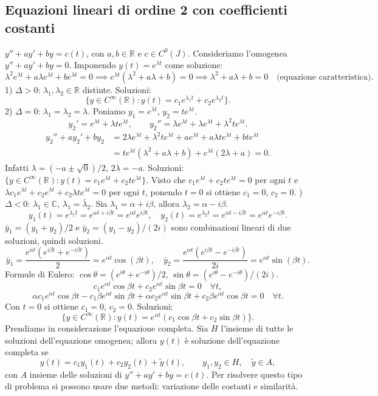 \documentclass[11pt,a4paper]{article}
\newcommand{\R}{\mathbb R}\newcommand{\N}{\mathbb N}\newcommand{\pagina}[1]{\clearpage}
\begin{document}
\subsection*{Equazioni lineari di ordine 2 con coefficienti costanti}
$y''+ay'+by=c(t)$, con $a,b\in\R$ e $c\in C^0(J)$. Consideriamo l'omogenea $y''+ay'+by=0$. Imponendo $y(t)=e^{\lambda t}$ come soluzione:
\[\lambda^2e^{\lambda t}+a\lambda e^{\lambda t}+be^{\lambda t}=0\implies e^{\lambda t}(\lambda^2+a\lambda+b)=0\implies\lambda^2+a\lambda+b=0\quad\text{(equazione caratteristica)}.\]
1) $\Delta>0$: $\lambda_1,\lambda_2\in\R$ distinte. Soluzioni:
\[\{y\in C^\infty(\R):y(t)=c_1e^{\lambda_1t}+c_2e^{\lambda_2t}\}.\]
2) $\Delta=0$: $\lambda_1=\lambda_2=\lambda$. Poniamo $y_1=e^{\lambda t}$, $y_2=te^{\lambda t}$.
\[y_2'=e^{\lambda t}+\lambda te^{\lambda t},\qquad y_2''=\lambda e^{\lambda t}+\lambda e^{\lambda t}+\lambda^2te^{\lambda t}.\]
\begin{align*}
 y_2''+ay_2'+by_2&=2\lambda e^{\lambda t}+\lambda^2te^{\lambda t}+ae^{\lambda t}+a\lambda te^{\lambda t}+bte^{\lambda t}\\
 &=te^{\lambda t}(\lambda^2+a\lambda+b)+e^{\lambda t}(2\lambda+a)=0.
\end{align*}
Infatti $\lambda=(-a\pm\sqrt0)/2$, $2\lambda=-a$.
Soluzioni: $\{y\in C^\infty(\R):y(t)=c_1e^{\lambda t}+c_2te^{\lambda t}\}$.
Visto che $c_1e^{\lambda t}+c_2te^{\lambda t}=0$ per ogni $t$ e $\lambda c_1e^{\lambda t}+c_2e^{\lambda t}+c_2\lambda te^{\lambda t}=0$ per ogni $t$, ponendo $t=0$ si ottiene $c_1=0$, $c_2=0$.
\pagina{52}
3) $\Delta<0$: $\lambda_1\in\mathbb C$, $\lambda_1=\bar\lambda_2$. Sia $\lambda_1=\alpha+i\beta$, allora $\lambda_2=\alpha-i\beta$.
\[y_1(t)=e^{\lambda_1t}=e^{\alpha t+i\beta t}=e^{\alpha t}e^{i\beta t},\quad y_2(t)=e^{\lambda_2t}=e^{\alpha t-i\beta t}=e^{\alpha t}e^{-i\beta t}.\]
$\bar y_1=(y_1+y_2)/2$ e $\bar y_2=(y_1-y_2)/(2i)$ sono combinazioni lineari di due soluzioni, quindi soluzioni.
\[\bar y_1=\frac{e^{\alpha t}(e^{i\beta t}+e^{-i\beta t})}2=e^{\alpha t}\cos(\beta t),\quad
\bar y_2=\frac{e^{\alpha t}(e^{i\beta t}-e^{-i\beta t})}{2i}=e^{\alpha t}\sin(\beta t).\]
Formule di Eulero: $\cos\theta=(e^{i\theta}+e^{-i\theta})/2$, $\sin\theta=(e^{i\theta}-e^{-i\theta})/(2i)$.
\[c_1e^{\alpha t}\cos\beta t+c_2e^{\alpha t}\sin\beta t=0\quad\forall t,\]
\[\alpha c_1e^{\alpha t}\cos\beta t-c_1\beta e^{\alpha t}\sin\beta t+\alpha c_2e^{\alpha t}\sin\beta t+c_2\beta e^{\alpha t}\cos\beta t=0\quad\forall t.\]
Con $t=0$ si ottiene $c_1=0$, $c_2=0$. Soluzioni:
\[\{y\in C^\infty(\R):y(t)=e^{\alpha t}(c_1\cos\beta t+c_2\sin\beta t)\}.\]
Prendiamo in considerazione l'equazione completa. Sia $H$ l'insieme di tutte le soluzioni dell'equazione omogenea; allora $y(t)$ è soluzione dell'equazione completa se
\[y(t)=c_1y_1(t)+c_2y_2(t)+\widetilde y(t),\qquad y_1,y_2\in H,\quad\widetilde y\in A,\]
con $A$ insieme delle soluzioni di $y''+ay'+by=c(t)$. Per risolvere questo tipo di problema si possono usare due metodi: variazione delle costanti e similarità.
\pagina{53}
\end{document}
